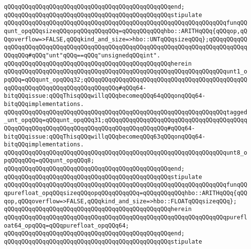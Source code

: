 \verb|qQQqqQQqqQQqqQQqqQQqqQQqqQQqqQQqqQQqqQQqqQQqqQQqend;|\newline
\newline
\verb|qQQqqQQqqQQqqQQqqQQqqQQqqQQqqQQqqQQqqQQqqQQqqQQqstipulate|\newline
\verb|qQQqqQQqqQQqqQQqqQQqqQQqqQQqqQQqqQQqqQQqqQQqqQQqqQQqqQQqqQQqqQQqfunqQQqunt_opqQQqsizeqQQqopqQQqqQQqqQQq=qQQqqQQqqQQqhbo::ARITHqQQq{qQQqop,qQQqoverflow=>FALSE,qQQqkind_and_size=>hbo::UNTqQQqsizeqQQq};qQQqqQQqqQQqqQQqqQQqqQQqqQQqqQQqqQQqqQQqqQQqqQQqqQQqqQQqqQQqqQQqqQQqqQQqqQQqqQQqqQQqqQQq#qQQq"unt"qQQq==qQQq"unsignedqQQqint".|\newline
\verb|qQQqqQQqqQQqqQQqqQQqqQQqqQQqqQQqqQQqqQQqqQQqqQQqherein|\newline
\verb|qQQqqQQqqQQqqQQqqQQqqQQqqQQqqQQqqQQqqQQqqQQqqQQqqQQqqQQqqQQqqQQqunt1_opqQQq=qQQqunt_opqQQq32;qQQqqQQqqQQqqQQqqQQqqQQqqQQqqQQqqQQqqQQqqQQqqQQqqQQqqQQqqQQqqQQqqQQqqQQqqQQqqQQq#qQQq64-bitqQQqissue:qQQqThisqQQqwillqQQqbecomeqQQq64qQQqonqQQq64-bitqQQqimplementations.|\newline
\verb|qQQqqQQqqQQqqQQqqQQqqQQqqQQqqQQqqQQqqQQqqQQqqQQqqQQqqQQqqQQqqQQqtagged_unt_opqQQq=qQQqunt_opqQQq31;qQQqqQQqqQQqqQQqqQQqqQQqqQQqqQQqqQQqqQQqqQQqqQQqqQQqqQQqqQQqqQQqqQQqqQQqqQQqqQQqqQQqqQQq#qQQq64-bitqQQqissue:qQQqThisqQQqwillqQQqbecomeqQQq63qQQqonqQQq64-bitqQQqimplementations.|\newline
\verb|qQQqqQQqqQQqqQQqqQQqqQQqqQQqqQQqqQQqqQQqqQQqqQQqqQQqqQQqqQQqqQQqunt8_opqQQqqQQq=qQQqunt_opqQQq8;|\newline
\verb|qQQqqQQqqQQqqQQqqQQqqQQqqQQqqQQqqQQqqQQqqQQqqQQqend;|\newline
\newline
\verb|qQQqqQQqqQQqqQQqqQQqqQQqqQQqqQQqqQQqqQQqqQQqqQQqstipulate|\newline
\verb|qQQqqQQqqQQqqQQqqQQqqQQqqQQqqQQqqQQqqQQqqQQqqQQqqQQqqQQqqQQqqQQqfunqQQqpurefloat_opqQQqsizeqQQqopqQQqqQQqqQQq=qQQqqQQqqQQqhbo::ARITHqQQq{qQQqop,qQQqoverflow=>FALSE,qQQqkind_and_size=>hbo::FLOATqQQqsizeqQQq};|\newline
\verb|qQQqqQQqqQQqqQQqqQQqqQQqqQQqqQQqqQQqqQQqqQQqqQQqherein|\newline
\verb|qQQqqQQqqQQqqQQqqQQqqQQqqQQqqQQqqQQqqQQqqQQqqQQqqQQqqQQqqQQqqQQqpurefloat64_opqQQq=qQQqpurefloat_opqQQq64;|\newline
\verb|qQQqqQQqqQQqqQQqqQQqqQQqqQQqqQQqqQQqqQQqqQQqqQQqend;|\newline
\newline
\verb|qQQqqQQqqQQqqQQqqQQqqQQqqQQqqQQqqQQqqQQqqQQqqQQqstipulate|\newline
